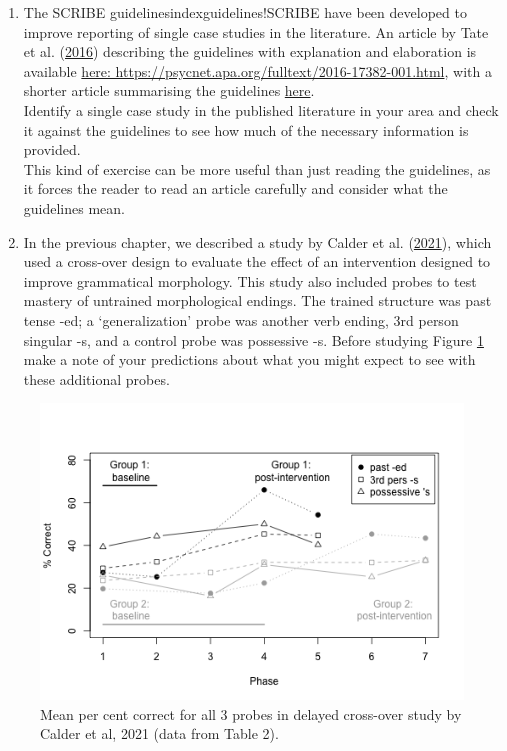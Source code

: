 \documentclass{krantz}
\begin{document}
\begin{enumerate}
\def\labelenumi{\arabic{enumi}.}
\setcounter{enumi}{1}
\item
  The SCRIBE guidelinesindex{guidelines!SCRIBE} have been developed to improve reporting of single case studies in the literature. An article by Tate et al. (\protect\hyperlink{ref-tate2016}{2016}) describing the guidelines with explanation and elaboration is available \href{https://psycnet.apa.org/fulltext/2016-17382-001.html}{here: https://psycnet.apa.org/fulltext/2016-17382-001.html}, with a shorter article summarising the guidelines \href{https://academic.oup.com/ptj/article/96/7/e1/2864911}{here}.\\
  Identify a single case study in the published literature in your area and check it against the guidelines to see how much of the necessary information is provided.\\
  This kind of exercise can be more useful than just reading the guidelines, as it forces the reader to read an article carefully and consider what the guidelines mean.
\item
  In the previous chapter, we described a study by Calder et al. (\protect\hyperlink{ref-calder2021}{2021}), which used a cross-over design to evaluate the effect of an intervention designed to improve grammatical morphology. This study also included probes to test mastery of untrained morphological endings. The trained structure was past tense -ed; a `generalization' probe was another verb ending, 3rd person singular -s, and a control probe was possessive -s. Before studying Figure \ref{fig:Calderplus} make a note of your predictions about what you might expect to see with these additional probes.
\end{enumerate}

\begin{figure}
\includegraphics[width=0.85\linewidth]{images_bw/calderfig-2} \caption{Mean per cent correct for all 3 probes in delayed cross-over study by Calder et al, 2021 (data from Table 2).}\label{fig:Calderplus}
\end{figure}
\end{document}
